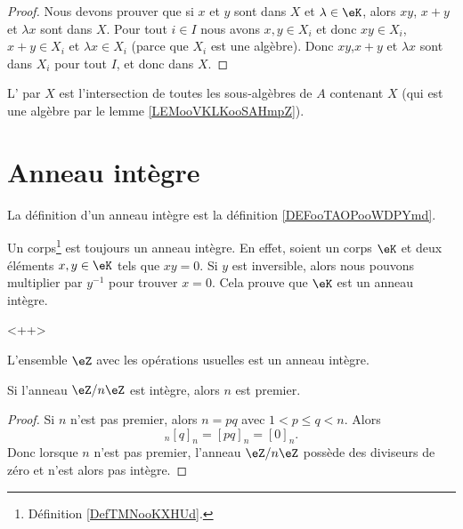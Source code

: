 \begin{proof}
    Nous devons prouver que si \( x\) et \( y\) sont dans \( X\) et \( \lambda\in \eK\), alors \( xy\), \( x+y\) et \( \lambda x\) sont dans \( X\). Pour tout \( i\in I\) nous avons \( x,y\in X_i\) et donc \( xy\in X_i\), \( x+y\in X_i\) et \( \lambda x\in X_i\) (parce que \( X_i\) est une algèbre). Donc \( xy\),\( x+y\) et \( \lambda x\) sont dans \( X_i\) pour tout \( I\), et donc dans \( X\).
\end{proof}

\begin{definition}\label{DefkAXaWY}
    L' par \( X\) est l'intersection de toutes les sous-algèbres de \( A\) contenant \( X\) (qui est une algèbre par le lemme \ref{LEMooVKLKooSAHmpZ}).
\end{definition}

\section{Anneau intègre}
\label{SECAnneauxIntegres}

La définition d'un anneau intègre est la définition \ref{DEFooTAOPooWDPYmd}.

\begin{example}     \label{EXooMXNTooZaRPPi}
    Un corps\footnote{Définition \ref{DefTMNooKXHUd}.} est toujours un anneau intègre. En effet, soient un corps \( \eK\) et deux éléments \( x,y\in \eK\) tels que \( xy=0\). Si \( y\) est inversible, alors nous pouvons multiplier par \( y^{-1}\) pour trouver \( x=0\). Cela prouve que \( \eK\) est un anneau intègre.
\end{example}
<++>

\begin{example}     \label{EXooLDXRooSxUAXs}
    L'ensemble \( \eZ\) avec les opérations usuelles est un anneau intègre.
\end{example}


\begin{lemma}
    Si l'anneau \( \eZ/n\eZ\) est intègre, alors \( n\) est premier.
\end{lemma}

\begin{proof}
    Si \( n\) n'est pas premier, alors \( n=pq\) avec \( 1<p\leq q<n\). Alors
    \begin{equation}
        [p]_n[q]_n=[pq]_n=[0]_n.
    \end{equation}
    Donc lorsque \( n\) n'est pas premier,  l'anneau \( \eZ/n\eZ\) possède des diviseurs de zéro et n'est alors pas intègre.
\end{proof}


